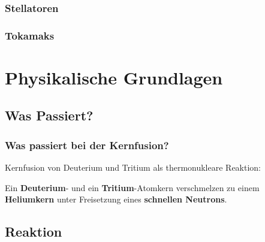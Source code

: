 \documentclass[aspectratio=169]{beamer}
\begin{document}
      \begin{frame}
        \frametitle{Stellatoren}
      \end{frame}

      \begin{frame}
        \frametitle{Tokamaks}
      \end{frame}

  \section{Physikalische Grundlagen}

    \subsection{Was Passiert?}

      \begin{frame}
        \frametitle{Was passiert bei der Kernfusion?}
        \center
        Kernfusion von Deuterium und Tritium als thermonukleare Reaktion:

        \bigskip
        \pause

        \bigskip

        Ein \textbf{Deuterium}- und ein \textbf{Tritium}-Atomkern verschmelzen zu einem \textbf{Heliumkern} unter Freisetzung eines \textbf{schnellen Neutrons}.

      \end{frame}

    \subsection{Reaktion}
\end{document}
